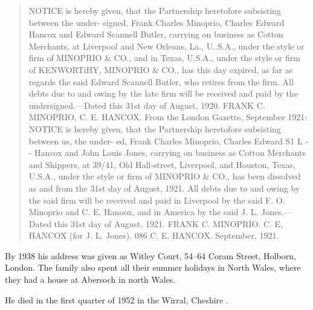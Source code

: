 \begin{quotation}
NOTICE is hereby given, that the Partnership heretofore subsisting between the under- signed, Frank Charles Minoprio, Charles Edward Hancox and Edward Scannell Butler, carrying on business as Cotton Merchants, at Liverpool and New Orleans, La., U..S.A., under the style or firm of MINOPRIO \& CO., and in Texas, U.S.A., under the style or firm of KENWORTiHY, MINOPRIO \& CO., has this day expired, as far as regards the said Edward Scannell Butler, who retires from the firm. All debts due to and owing by the late firm will be received and paid by the undersigned.—Dated this 31st day of August, 1920. FRANK C. MINOPRIO, C. E. HANCOX. From the London Gazette, September 1921: NOTICE is hereby given, that the Partnership heretofore subsisting between us, the under- ed, Frank Charles Minoprio, Charles Edward S1 L - - Hancox and John Louis Jones, carrying on business as Cotton Merchants and Shippers, at 39/41, Old Hall-street, Liverpool, and Houston, Texas, U.S.A., under the style or firm of MINOPRIO \& CO., has been dissolved as and from the 31st day of August, 1921. All debts due to and owing by the said firm will be received and paid in Liverpool by the said F. O. Minoprio and C. E. Hanoox, and in America by the said J. L. Jones.—Dated this 31st day of August, 1921. FRANK C. MINOPRIO. C. E, HANCOX (for J. L. Jones). 086 C. E. HANCOX. September, 1921.
\end{quotation}

 By 1938 his address was given as Witley Court, 54--64 Coram Street, Holborn, London.\cite{CharlesEdwardHancoxLondonhouse}  The family also spent all their summer holidays in North Wales, where they had a house at Abersoch in north Wales.

He died in the first quarter of 1952 in the Wirral, Cheshire \cite{CEHancoxDeath}.
